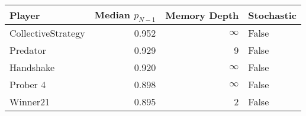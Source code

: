 \begin{tabular}{lrrl}
\toprule
             Player &  Median $p_{N-1}$ &  Memory Depth & Stochastic \\
\midrule
 CollectiveStrategy &             0.952 &            \(\infty\) &      False \\
           Predator &             0.929 &             9 &      False \\
          Handshake &             0.920 &            \(\infty\) &      False \\
           Prober 4 &             0.898 &            \(\infty\) &      False \\
           Winner21 &             0.895 &             2 &      False \\
\bottomrule
\end{tabular}
